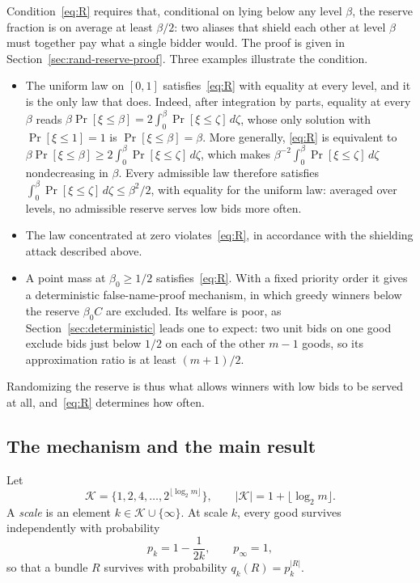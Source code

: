 \documentclass[format=acmsmall, review=false]{acmart}
\begin{document}
Condition~\eqref{eq:R} requires that, conditional on lying below
any level \(\beta\), the reserve fraction is on average at least
\(\beta/2\): two aliases that shield each other at level
\(\beta\) must together pay what a single bidder would. The proof
is given in Section~\ref{sec:rand-reserve-proof}. Three examples
illustrate the condition.

\begin{itemize}
\item The uniform law on \([0,1]\) satisfies~\eqref{eq:R} with
equality at every level, and it is the only law that does.
Indeed, after integration by parts, equality at every \(\beta\)
reads
\(\beta\Pr[\xi\le\beta]=2\int_0^\beta\Pr[\xi\le\zeta]\,d\zeta\),
whose only solution with \(\Pr[\xi\le1]=1\) is
\(\Pr[\xi\le\beta]=\beta\). More generally, \eqref{eq:R} is
equivalent to
\(\beta\Pr[\xi\le\beta]\ge2\int_0^\beta\Pr[\xi\le\zeta]\,d\zeta\),
which makes \(\beta^{-2}\int_0^\beta\Pr[\xi\le\zeta]\,d\zeta\)
nondecreasing in \(\beta\). Every admissible law therefore
satisfies \(\int_0^\beta\Pr[\xi\le\zeta]\,d\zeta\le\beta^2/2\),
with equality for the uniform law: averaged over levels, no
admissible reserve serves low bids more often.
\item The law concentrated at zero violates~\eqref{eq:R}, in
accordance with the shielding attack described above.
\item A point mass at \(\beta_0\ge1/2\) satisfies~\eqref{eq:R}.
With a fixed priority order it gives a deterministic
false-name-proof mechanism, in which greedy winners below the
reserve \(\beta_0C\) are excluded. Its welfare is poor, as
Section~\ref{sec:deterministic} leads one to expect: two unit
bids on one good exclude bids just below \(1/2\) on each of the
other \(m-1\) goods, so its approximation ratio is at least
\((m+1)/2\).
\end{itemize}
Randomizing the reserve is thus what allows winners with low
bids to be served at all, and~\eqref{eq:R} determines how often.

\subsection{The mechanism and the main result}
\label{sec:rand-mechanism}

Let
\[
\mathcal K=\bigl\{1,2,4,\ldots,2^{\lfloor\log_2m\rfloor}\bigr\},
\qquad
|\mathcal K|=1+\lfloor\log_2m\rfloor.
\]
A \emph{scale} is an element \(k\in\mathcal K\cup\{\infty\}\). At
scale \(k\), every good survives independently with probability
\[
p_k=1-\frac{1}{2k},
\qquad
p_\infty=1,
\]
so that a bundle \(R\) survives with probability
\(q_k(R)=p_k^{|R|}\).
\end{document}
